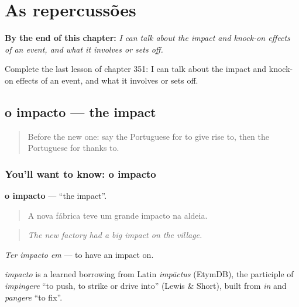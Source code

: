 
\chapter{As repercussões}
\label{ch:pt-as-repercussoes}

\begin{chapteropening}
\textbf{By the end of this chapter:} \emph{I can talk about the impact and knock-on effects of an event, and what it involves or sets off.}

Complete the last lesson of chapter 351: I can talk about the impact and knock-on effects of an event, and what it involves or sets off.
\end{chapteropening}

\section[o impacto]{o impacto — the impact}

\label{lesson:PT-C351-impacto}



\begin{quote}
Before the new one: say the Portuguese for to give rise to, then the Portuguese for thanks to.
\end{quote}

\subsection*{You'll want to know: o impacto}
\textbf{o impacto} — \textquotedblleft{}the impact\textquotedblright{}.

\begin{quote}
A nova fábrica teve um grande impacto na aldeia.
\end{quote}

\begin{quote}
\emph{The new factory had a big impact on the village.}
\end{quote}

\emph{Ter impacto em} — to have an impact on.

\begin{cousinweb}
\emph{impacto} is a learned borrowing from Latin \emph{impāctus} (EtymDB), the participle of \emph{impingere} \textquotedblleft{}to push, to strike or drive into\textquotedblright{} (Lewis \& Short), built from \emph{in} and \emph{pangere} \textquotedblleft{}to fix\textquotedblright{}.
\end{cousinweb}

